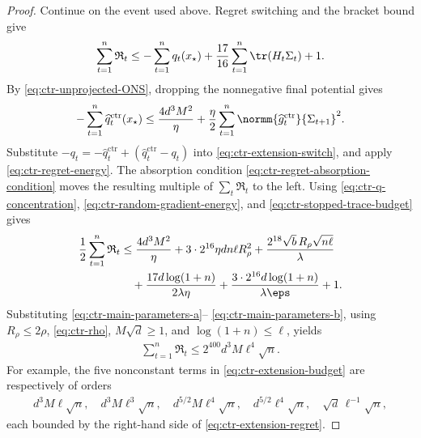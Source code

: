 \begin{proof}
    Continue on the event used above.  Regret switching and the bracket bound
    give
    \begin{align}
        \sum_{t=1}^n\mathfrak R_t
        \leq
        -\sum_{t=1}^nq_t(x_\star)
        +\frac{17}{16}\sum_{t=1}^n\tr(H_t\Sigma_t)+1.
        \label{eq:ctr-extension-switch}
    \end{align}
    By \eqref{eq:ctr-unprojected-ONS}, dropping the nonnegative final
    potential gives
    \begin{align}
        -\sum_{t=1}^n\widehat q_t^{\mathrm{ctr}}(x_\star)
        \leq
        \frac{4d^3M^2}{\eta}
        +\frac\eta2\sum_{t=1}^n
        \normm{\widehat g_t^{\mathrm{ctr}}}{\Sigma_{t+1}}^2.
        \label{eq:ctr-ONS-regret}
    \end{align}
    Substitute
    $-q_t=-\widehat q_t^{\mathrm{ctr}}
        +(\widehat q_t^{\mathrm{ctr}}-q_t)$ into
    \eqref{eq:ctr-extension-switch}, and apply
    \eqref{eq:ctr-regret-energy}.  The absorption condition
    \eqref{eq:ctr-regret-absorption-condition} moves the resulting multiple of
    $\sum_t\mathfrak R_t$ to the left.  Using
    \eqref{eq:ctr-q-concentration},
    \eqref{eq:ctr-random-gradient-energy}, and
    \eqref{eq:ctr-stopped-trace-budget} gives
    \begin{align}
        \frac12\sum_{t=1}^n\mathfrak R_t
         & \leq
        \frac{4d^3M^2}{\eta}
        +3\cdot2^{16}\eta dn\ell R_\rho^2
        +\frac{2^{18}\sqrt b\,R_\rho\sqrt{n\ell}}\lambda
        \nonumber \\
         & \quad
        +\frac{17d\log(1+n)}{2\lambda\eta}
        +\frac{3\cdot2^{16}d\log(1+n)}{\lambda\eps}
        +1.
        \label{eq:ctr-extension-budget}
    \end{align}
    Substituting \eqref{eq:ctr-main-parameters-a}--
    \eqref{eq:ctr-main-parameters-b}, using
    $R_\rho\leq2\rho$, \eqref{eq:ctr-rho},
    $M\sqrt d\geq1$, and $\log(1+n)\leq\ell$, yields
    \begin{align}
        \sum_{t=1}^n\mathfrak R_t
        \leq2^{400}d^3M\ell^4\sqrt n.
        \label{eq:ctr-extension-regret}
    \end{align}
    For example, the five nonconstant terms in
    \eqref{eq:ctr-extension-budget} are respectively of orders
    \begin{align}
        d^3M\ell\sqrt n,
        \quad
        d^3M\ell^3\sqrt n,
        \quad
        d^{5/2}M\ell^4\sqrt n,
        \quad
        d^{5/2}\ell^4\sqrt n,
        \quad
        \sqrt d\,\ell^{-1}\sqrt n,
    \end{align}
    each bounded by the right-hand side of
    \eqref{eq:ctr-extension-regret}.


\end{proof}
